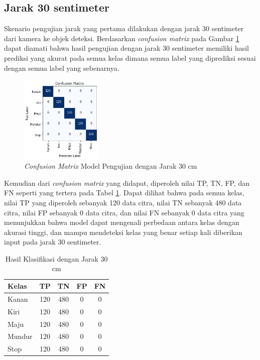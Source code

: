 \subsection{Jarak 30 sentimeter}

Skenario pengujian jarak yang pertama dilakukan dengan jarak 30 sentimeter dari kamera ke objek deteksi. Berdasarkan \emph{confusion matrix} pada Gambar \ref{fig:matrix2} dapat diamati bahwa hasil pengujian dengan jarak 30 sentimeter memiliki hasil prediksi yang akurat pada semua kelas dimana semua label yang diprediksi sesuai dengan semua label yang sebenarnya.

\begin{figure} [H] \centering
  \includegraphics[width=0.35\textwidth]{gambar/bab4/model5 (30cm)/matrix.png}
  \caption{\emph{Confusion Matrix} Model Pengujian dengan Jarak 30 cm}
  \label{fig:matrix2}
\end{figure}

Kemudian dari \emph{confusion matrix} yang didapat, diperoleh nilai TP, TN, FP, dan FN seperti yang tertera pada Tabel \ref{tb:cm_model2}. Dapat dilihat bahwa pada semua kelas, nilai TP yang diperoleh sebanyak 120 data citra, nilai TN sebanyak 480 data citra, nilai FP sebanyak 0 data citra, dan nilai FN sebanyak 0 data citra yang menunjukkan bahwa model dapat mengenali perbedaan antara kelas dengan akurasi tinggi, dan mampu mendeteksi kelas yang benar setiap kali diberikan input pada jarak 30 sentimeter.

\begin{longtable}{|l|c|c|c|c|}
  \caption{Hasil Klasifikasi dengan Jarak 30 cm}
  \label{tb:cm_model2} \\
  \hline
  \rowcolor[HTML]{C0C0C0} 
  \textbf{Kelas} & \textbf{TP} & \textbf{TN} & \textbf{FP} & \textbf{FN} \\ \hline
  Kanan    & 120          & 480         & 0           & 0           \\ \hline
  Kiri      & 120          & 480         & 0           & 0           \\ \hline
  Maju      & 120          & 480         & 0           & 0           \\ \hline
  Mundur     & 120          & 480         & 0           & 0           \\ \hline
  Stop  & 120          & 480         & 0           & 0           \\ \hline
\end{longtable}

